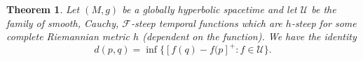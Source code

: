 \documentclass[a4paper]{jpconf}
\newtheorem{theorem}{Theorem}[section]
\theoremstyle{definition}
\theoremstyle{remark}
\newtheorem{remark}[theorem]{Remark}
\begin{document}
\begin{theorem} \label{nug}
Let $(M,g)$ be a globally hyperbolic spacetime and let $\mathscr{U}$ be the family of smooth, Cauchy, $\mathscr{F}$-steep temporal functions which are $h$-steep for some complete Riemannian metric $h$ (dependent on the function). We have the identity
\begin{equation} \label{dsf}
d(p,q)=\inf\{[f(q)-f(p]^+\colon  f \in \mathscr{U}\}
.\end{equation}
\end{theorem}
%
%
\end{document}
